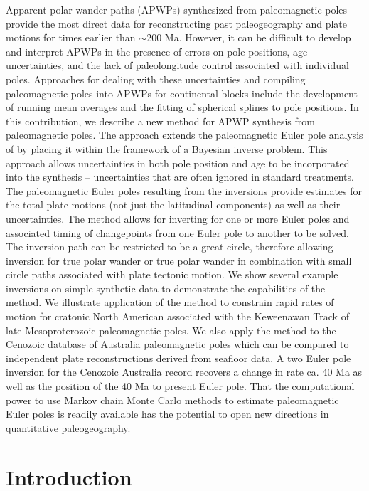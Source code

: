\documentclass[11pt,letterpaper]{article}
\begin{document}
Apparent polar wander paths (APWPs) synthesized from paleomagnetic poles provide the most direct data for reconstructing past paleogeography and plate motions for times earlier than $\sim$200 Ma. However, it can be difficult to develop and interpret APWPs in the presence of errors on pole positions, age uncertainties, and the lack of paleolongitude control associated with individual poles. Approaches for dealing with these uncertainties and compiling paleomagnetic poles into APWPs for continental blocks include the development of running mean averages and the fitting of spherical splines to pole positions. In this contribution, we describe a new method for APWP synthesis from paleomagnetic poles. The approach extends the paleomagnetic Euler pole analysis of \cite{Gordon1984a} by placing it within the framework of a Bayesian inverse problem. This approach allows uncertainties in both pole position and age to be incorporated into the synthesis -- uncertainties that are often ignored in standard treatments. The paleomagnetic Euler poles resulting from the inversions provide estimates for the total plate motions (not just the latitudinal components) as well as their uncertainties. The method allows for inverting for one or more Euler poles and associated timing of changepoints from one Euler pole to another to be solved. The inversion path can be restricted to be a great circle, therefore allowing inversion for true polar wander or true polar wander in combination with small circle paths associated with plate tectonic motion. We show several example inversions on simple synthetic data to demonstrate the capabilities of the method. We illustrate application of the method to constrain rapid rates of motion for cratonic North American associated with the Keweenawan Track of late Mesoproterozoic paleomagnetic poles. We also apply the method to the Cenozoic database of Australia paleomagnetic poles which can be compared to independent plate reconstructions derived from seafloor data. A two Euler pole inversion for the Cenozoic Australia record recovers a change in rate ca. 40 Ma as well as the position of the 40 Ma to present Euler pole. That the computational power to use Markov chain Monte Carlo methods to estimate paleomagnetic Euler poles is readily available has the potential to open new directions in quantitative paleogeography.

\section*{Introduction}
\end{document}
